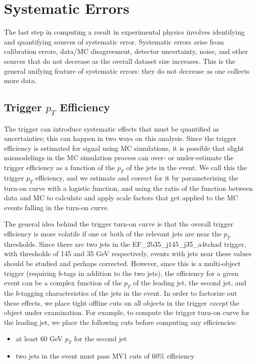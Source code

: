  

\chapter[Systematic Errors]{Systematic Errors}

The last step in computing a result in experimental physics involves identifying
and quantifying sources of systematic error.  Systematic errors arise from calibration
errors, data/MC disagreement, detector uncertainty, noise, and other sources
that do not decrease as the overall dataset size increases.  This is the general
unifying feature of systematic errors: they do not decrease as one collects more data.


\section{Trigger $p_T$ Efficiency}
\label{sec:trigger_syst}

The trigger can introduce systematic effects that must be quantified as uncertainties; 
this can happen in two ways on this analysis.  Since the trigger efficiency is estimated
for signal using MC simulations, it is possible that slight mismodelings in the MC 
simulation process can over- or under-estimate the trigger efficiency as a function 
of the $p_T$ of the jets in the event.  We call this the trigger $p_T$ efficiency,
and we estimate and correct for it by parameterizing the turn-on curve with a logistic
function, and using the ratio of the function between data and MC to calculate and 
apply scale factors that get applied to the MC events falling in the turn-on curve.  

The general idea behind the trigger turn-on curve is that the overall trigger efficiency
is more volatile if one or both of the relevant jets are near the $p_T$ thresholds.
Since there are two jets in the EF\_2b35\_j145\_j35\_a4tchad trigger, with thresholds
of 145 and 35 GeV respectively, events with jets near these values should be studied
and perhaps corrected.  However, since this is a multi-object trigger (requiring $b$-tags
in addition to the two jets), the efficiency for a given event can be a complex function
of the $p_T$ of the leading jet, the second jet, and the $b$-tagging characteristics of
the jets in the event.  In order to factorize out these effects, we place tight offline
cuts on all objects in the trigger \textit{except} the object under examination. For example, 
to compute the trigger turn-on curve for the leading jet, we place the following cuts before
computing any efficiencies: 
\begin{itemize}
    \item at least 60 GeV $p_T$ for the second jet
    \item two jets in the event must pass MV1 cuts of 60\% efficiency
\end{itemize}

